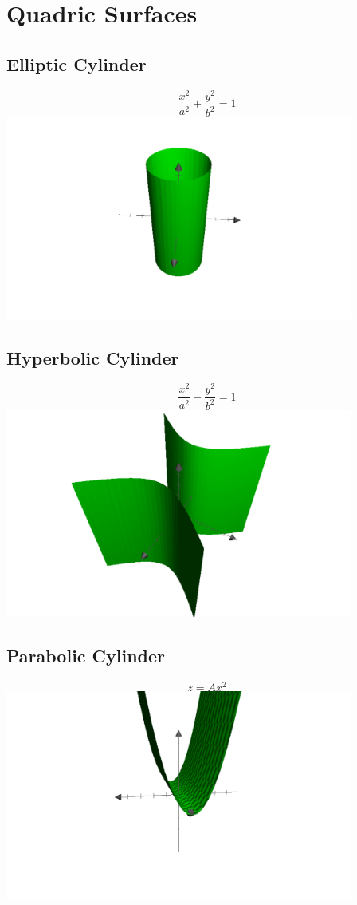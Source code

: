 \documentclass[10pt,letterpaper]{article}
\begin{document}
	
	\section{Quadric Surfaces}
	
	\subsection{Elliptic Cylinder}
	\[  \frac{x^2}{a^2}+\frac{y^2}{b^2} = 1 \]
	\includegraphics[width=4.5in]{ellipticcylinder.pdf}

	\subsection{Hyperbolic Cylinder}
	\[  \frac{x^2}{a^2}-\frac{y^2}{b^2}=1 \]
	\includegraphics[width=4.5in]{hyperboliccylinder.pdf}
	\newpage

	\subsection{Parabolic Cylinder}
	\[  z=Ax^2 \]
	\includegraphics[width=4.5in]{paraboliccylinder.pdf}
	
\end{document}
